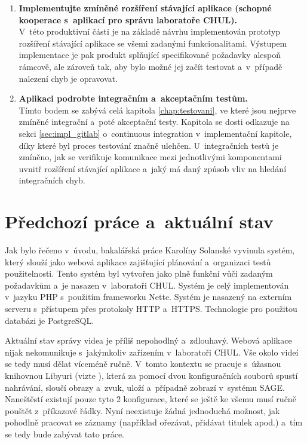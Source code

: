 \documentclass[thesis=M,czech]{FITthesis}[2012/06/26]
\begin{document}
\begin{enumerate}
	\item \textbf{Implementujte zmíněné rozšíření stávající aplikace (schopné kooperace s~aplikací pro správu laboratoře
CHUL).\\}
	V~této produktivní části je na základě návrhu implementován prototyp rozšíření stávající aplikace se všemi zadanými funkcionalitami. Výstupem implementace je pak produkt splňující specifikované požadavky alespoň rámcově, ale zároveň tak, aby bylo možné jej začít testovat a~v~případě nalezení chyb je opravovat.  
	\item \textbf{Aplikaci podrobte integračním a~akceptačním testům.\\}
	Tímto bodem se zabývá celá kapitola \ref{chap:testovani}, ve které jsou nejprve zmíněné integrační a~poté akceptační testy. Kapitola se dosti odkazuje na sekci \ref{sec:impl_gitlab} o~continuous integration v~implementační kapitole, díky které byl proces testování značně ulehčen. U~integračních testů je zmíněno, jak se verifikuje komunikace mezi jednotlivými komponentami uvnitř rozšíření stávající aplikace a~jaký má daný způsob vliv na hledání integračních chyb.
\end{enumerate}

\section{Předchozí práce a~aktuální stav} \label{sec:analyza_predchozi_prace}
Jak bylo řečeno v~úvodu, bakalářská práce Karolíny Solanské vyvinula systém, který slouží jako webová aplikace zajišťující plánování a~organizaci testů použitelnosti. Tento systém byl vytvořen jako plně funkční vůči zadaným požadavkům a~je nasazen v~laboratoři CHUL. Systém je celý implementován v~jazyku PHP s~použitím frameworku Nette. Systém je nasazený na externím serveru s~přístupem přes protokoly HTTP a~HTTPS. Technologie pro použitou databázi je PostgreSQL.
	
	Aktuální stav správy videa je příliš nepohodlný a~zdlouhavý. Webová aplikace nijak nekomunikuje s~jakýmkoliv zařízením v~laboratoři CHUL. Vše okolo videí se tedy musí dělat víceméně ručně. V~tomto kontextu se pracuje s~úžasnou knihovnou Libyuri (vizte \cite{yuri}), která za pomocí dvou konfiguračních souborů spustí nahrávání, sloučí obrazy a~zvuk, uloží a~případně zobrazí v~systému SAGE. Naneštěstí existují pouze tyto 2 konfigurace, které se ještě ke všemu musí ručně pouštět z~příkazové řádky. Nyní neexistuje žádná jednoduchá možnost, jak pohodlně pracovat se záznamy (například ořezávat, přidávat titulek apod.) a~tím se tedy bude zabývat tato práce.
	
\end{document}
